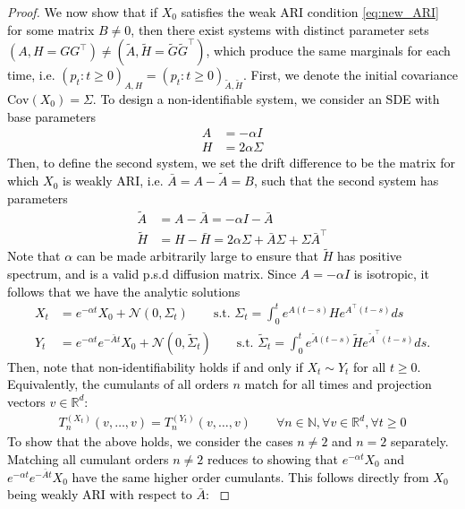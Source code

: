 \documentclass[twoside,11pt]{article}
\newcommand{\N}{\mathbb{N}}
\newcommand{\R} {\mathbb R}
\newcommand{\cov} {\mathrm{Cov}}
\newcommand{\rv}[1]{\textcolor{black}{#1}}
\begin{document}
\begin{proof}
\rv{We now show that if $X_0$ satisfies the weak ARI condition \eqref{eq:new_ARI} for some matrix $B \neq 0$, then there exist systems with distinct parameter sets $(A, H=GG^\top) \neq (\tilde{A}, \tilde{H}=\tilde{G}\tilde{G}^\top)$, which produce the same marginals for each time, i.e. $(p_t : t \ge 0)_{A,H} = (p_t : t \ge 0)_{\tilde{A},\tilde{H}}$. First, we denote the initial covariance $\cov(X_0)=\Sigma$. To design a non-identifiable system, we consider an SDE with base parameters 
\begin{align*}
    A &= -\alpha I \\
    H&=2\alpha \Sigma
\end{align*}
Then, to define the second system, we set the drift difference to be the matrix for which $X_0$ is weakly ARI, i.e. $\bar{A} = A - \tilde{A} = B$, such that the second system has parameters
\begin{align*}
    \tilde{A} &= A - \bar{A} = -\alpha I - \bar{A}\\
    \tilde{H} &= H - \bar{H}= 2\alpha \Sigma + \bar{A} \Sigma + \Sigma \bar{A}^\top
\end{align*}
Note that $\alpha$ can be made arbitrarily large to ensure that $\tilde{H}$ has positive spectrum, and is a valid p.s.d diffusion matrix. Since $A=-\alpha I$ is isotropic, it follows that we have the analytic solutions 
\begin{align*}
    X_t &= e^{-\alpha t}X_0 + \mathcal{N}(0, \Sigma_t) \qquad \text{s.t. } \Sigma_t = \int_0^t e^{A(t-s)}He^{A^\top (t-s)}ds \\
    Y_t &= e^{-\alpha t}e^{-\bar{A}t}X_0 + \mathcal{N}(0, \tilde{\Sigma}_t) \qquad \text{s.t. } \tilde{\Sigma}_t = \int_0^t e^{\tilde{A}(t-s)}\tilde{H}e^{\tilde{A}^\top (t-s)}ds.
\end{align*}
Then, note that non-identifiability holds if and only if $X_t \sim Y_t$ for all $t \ge 0$. Equivalently, the cumulants of all orders $n$ match for all times and projection vectors $v \in \R^d$:
\begin{align}
    T_n^{(X_t)}(v, \ldots, v) = T_n^{(Y_t)}(v, \ldots, v)\qquad \forall n \in \N, \forall v \in \R^d, \forall t \ge 0
    \label{eq:non_iden_all_cumulants_match}
\end{align}
To show that the above holds, we consider the cases $n \neq 2$ and $n=2$ separately. Matching all cumulant orders $n \neq 2$ reduces to showing that $e^{-\alpha t}X_0$ and $e^{-\alpha t}e^{-\bar{A}t}X_0$ have the same higher order cumulants. This follows directly from $X_0$ being weakly ARI with respect to $\bar{A}$:
}
\end{proof}
\end{document}
